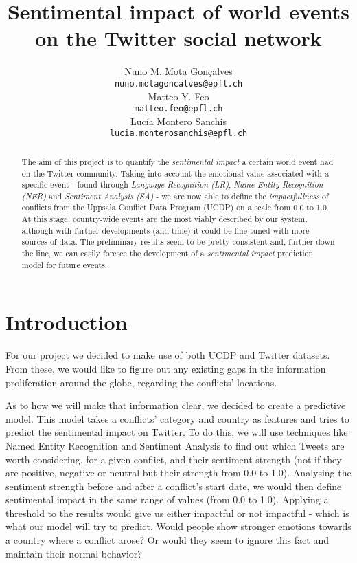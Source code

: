 \documentclass[11pt]{article}
\title{Sentimental impact of world events on the Twitter social network}
\author{Nuno M. Mota Gon\c{c}alves \\
  {\tt \small nuno.motagoncalves@epfl.ch} \\\And
  Matteo Y. Feo \\
  {\tt \small matteo.feo@epfl.ch} \\\And
  Luc\'{i}a Montero Sanchis\\
  {\tt \small lucia.monterosanchis@epfl.ch} \\}
\date{}
\begin{document}
\maketitle
\begin{abstract}
The aim of this project is to quantify the \textit{sentimental impact} a certain world event had on the Twitter community. Taking into account the emotional value associated with a specific event - found through \textit{Language Recognition (LR)}, \textit{Name Entity Recognition (NER)} and \textit{Sentiment Analysis (SA)} - we are now able to define the \textit{impactfullness} of conflicts from the Uppsala Conflict Data Program (UCDP) on a scale from 0.0 to 1.0. At this stage, country-wide events are the most viably described by our system, although with further developments (and time) it could be fine-tuned with more sources of data. The preliminary results seem to be pretty consistent and, further down the line, we can easily foresee the development of a \textit{sentimental impact} prediction model for future events.
\end{abstract}

\section{Introduction}

For our project we decided to make use of both UCDP and Twitter datasets. From these, we would like to figure out any existing gaps in the information proliferation around the globe, regarding the conflicts' locations.

As to how we will make that information clear, we decided to create a predictive model. This model takes a conflicts' category and country as features and tries to predict the sentimental impact on Twitter. To do this, we will use techniques like Named Entity Recognition and Sentiment Analysis to find out which Tweets are worth considering, for a given conflict, and their sentiment strength (not if they are positive, negative or neutral but their strength from 0.0 to 1.0). Analysing the sentiment strength before and after a conflict's start date, we would then define sentimental impact in the same range of values (from 0.0 to 1.0). Applying a threshold to the results would give us either impactful or not impactful - which is what our model will try to predict. Would people show stronger emotions towards a country where a conflict arose? Or would they seem to ignore this fact and maintain their normal behavior?
\end{document}
